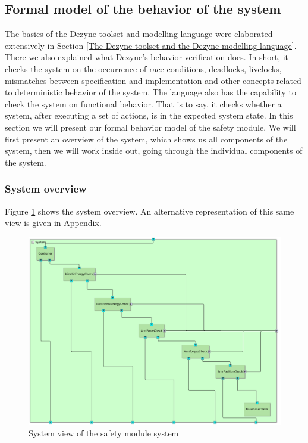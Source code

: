 \documentclass[12pt]{scrreprt}
\begin{document}
\subsection{Formal model of the behavior of the system}
\label{Formal model of the behavior of the system}
The basics of the Dezyne toolset and modelling language were elaborated extensively in Section \ref{The Dezyne toolset and the Dezyne modelling language}. There we also explained what Dezyne's behavior verification does. In short, it checks the system on the occurrence of race conditions, deadlocks, livelocks, mismatches between specification and implementation and other concepts related to deterministic behavior of the system. The language also has the capability to check the system on functional behavior. That is to say, it checks whether a system, after executing a set of actions, is in the expected system state. In this section we will present our formal behavior model of the safety module. We will first present an overview of the system, which shows us all components of the system, then we will work inside out, going through the individual components of the system.
\subsubsection{System overview}
\label{System overview}
Figure \ref{fig:safety_module_system_view} shows the system overview. An alternative representation of this same view is given in Appendix.

\begin{figure}[H]
    \centering
    \includegraphics[width=\textwidth]{Figures/results/modelling_figures/system_view/system_view.png}
    \caption{System view of the safety module system}
    \label{fig:safety_module_system_view}
\end{figure}
\end{document}
